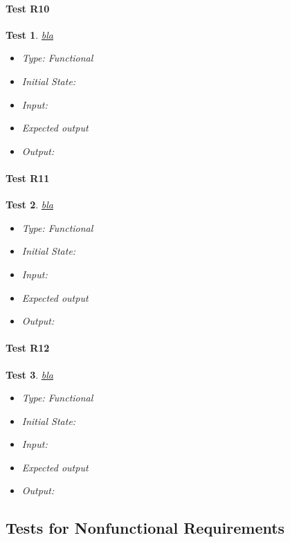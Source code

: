 \documentclass[12pt, titlepage]{article}
\newtheorem{Test}{Test}
\begin{document}
\paragraph{Test R10}	

\begin{Test}\normalfont\underline{bla}
\begin{itemize}
\item Type: Functional
\item Initial State:
\item Input: 
\item Expected output
\item Output:  
\end{itemize}
\end{Test}

\paragraph{Test R11}

\begin{Test}\normalfont\underline{bla}
\begin{itemize}
\item Type: Functional
\item Initial State:
\item Input: 
\item Expected output
\item Output:  
\end{itemize}
\end{Test}

\paragraph{Test R12}						

\begin{Test}\normalfont\underline{bla}
\begin{itemize}
\item Type: Functional
\item Initial State:
\item Input: 
\item Expected output
\item Output:  
\end{itemize}
\end{Test}					


\subsection{Tests for Nonfunctional Requirements}
\end{document}
